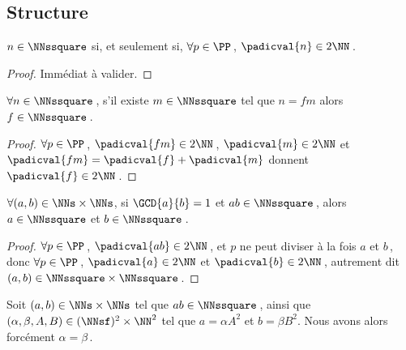 \subsection{Structure}




\leavevmode
\smallskip

\begin{fact} \label{prime-square}
	$n \in \NNssquare$ si, et seulement si,
	$\forall p \in \PP$\,,
	$\padicval{n} \in 2 \NN$\,.
\end{fact}


\begin{proof}
	Immédiat à valider.
\end{proof}




\begin{fact} \label{facto-square}
	$\forall n \in \NNssquare$\,, s'il existe $m \in \NNssquare$ tel que $n =  f m$ alors $f  \in \NNssquare$\,.
\end{fact}


\begin{proof}
	$\forall p \in \PP$\,, 
	$\padicval{f m} \in 2 \NN$\,,
	$\padicval{m} \in 2 \NN$
	et
	$\padicval{f m} = \padicval{f} + \padicval{m}$
	donnent
	$\padicval{f} \in 2 \NN$\,.
\end{proof}




\begin{fact} \label{prime-square}
	$\forall (a, b) \in \NNs \times \NNs$, 
	si $\GCD{a}{b} = 1$ et $a b \in \NNssquare$\,,
	alors $a \in \NNssquare$ et $b \in \NNssquare$\,.
\end{fact}


\begin{proof}
	$\forall p \in \PP$\,, $\padicval{ab} \in 2 \NN$\,,
	et $p$ ne peut diviser à la fois $a$ et $b$\,,
	donc
    $\forall p \in \PP$\,, 
    $\padicval{a} \in 2 \NN$ et $\padicval{b} \in 2 \NN$\,,
    autrement dit 
    $(a, b) \in \NNssquare \times \NNssquare$\,.
\end{proof}




\begin{fact} \label{same-square-free}
	Soit $(a, b) \in \NNs \times \NNs$ tel que $a b \in \NNssquare$\,,
	ainsi que $(\alpha, \beta, A, B) \in ( \NNsf )^2 \times \NN^2$ tel que $a = \alpha A^2$ et $b = \beta B^2$.
	Nous avons alors forcément $\alpha = \beta$\,.
\end{fact}


